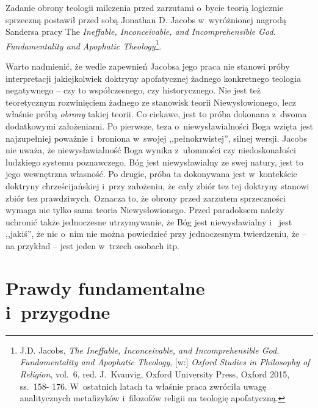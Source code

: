Zadanie obrony teologii milczenia przed zarzutami o~bycie teorią logicznie sprzeczną postawił przed sobą Jonathan D. Jacobs w~wyróżnionej nagrodą Sandersa pracy The \textit{Ineffable, Inconceivable, and Incomprehensible God. Fundamentality and Apophatic Theology}\footnote{J.D. Jacobs, \textit{The Ineffable, Inconceivable, and Incomprehensible God. Fundamentality and Apophatic Theology}, [w:] \textit{Oxford Studies in Philosophy of Religion}, vol.~6, red. J.~Kvanvig, Oxford University Press, Oxford 2015, ss.~158- 176. W~ostatnich latach ta właśnie praca zwróciła uwagę analitycznych metafizyków i~filozofów religii na teologię apofatyczną.}.

Warto nadmienić, że wedle zapewnień Jacobsa jego praca nie stanowi próby interpretacji jakiejkolwiek doktryny apofatycznej żadnego konkretnego teologia negatywnego -- czy to współczesnego, czy historycznego. Nie jest też teoretycznym rozwinięciem żadnego ze stanowisk teorii Niewysłowionego, lecz właśnie próbą \textit{obrony} takiej teorii. Co ciekawe, jest to próba dokonana z~dwoma dodatkowymi założeniami. Po pierwsze, teza o~niewysławialności Boga wzięta jest najzupełniej poważnie i~broniona w~swojej ,,pełnokrwistej'', silnej wersji. Jacobs nie uważa, że niewysławialność Boga wynika z~ułomności czy niedoskonałości ludzkiego systemu poznawczego. Bóg jest niewysławialny ze swej natury, jest to jego wewnętrzna własność. Po drugie, próba ta dokonywana jest w~kontekście doktryny chrześcijańskiej i~przy założeniu, że cały zbiór tez tej doktryny stanowi zbiór tez prawdziwych. Oznacza to, że obrony przed zarzutem sprzeczności wymaga nie tylko sama teoria Niewysłowionego. Przed paradoksem należy uchronić także jednoczesne utrzymywanie, że Bóg jest niewysławialny i~ jest ,,jakiś'', że nic o~nim nie można powiedzieć przy jednoczesnym twierdzeniu, że -- na przykład -- jest jeden w~trzech osobach itp.


\section{Prawdy fundamentalne i~przygodne}

